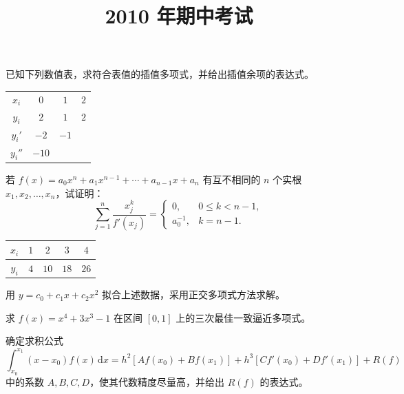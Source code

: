 \documentclass[fontset=exam]{exam-zh}
\title{2010 年期中考试}
\begin{document}
\maketitle
{}

\begin{question}[index=1]
已知下列数值表，求符合表值的插值多项式，并给出插值余项的表达式。
\begin{center}
\begin{tabular}{c|ccc}
$x_i$ & $0$ & $1$ & $2$ \\
$y_i$ & $2$ & $1$ & $2$ \\
$y_i'$ & $-2$ & $-1$ & \\
$y_i''$ & $-10$ & &
\end{tabular}
\end{center}
\end{question}

\begin{question}[index=2]
若 $f(x)=a_0x^n+a_1x^{n-1}+\cdots+a_{n-1}x+a_n$ 有互不相同的 $n$ 个实根
$x_1,x_2,\ldots,x_n$，试证明：
\[
\sum_{j=1}^{n}\frac{x_j^k}{f'(x_j)}=
\begin{cases}
0, & 0\leq k<n-1,\\
a_0^{-1}, & k=n-1.
\end{cases}
\]
\end{question}

\begin{question}[index=3]
\begin{tabular}{|c|c|c|c|c|}
\hline
$x_i$ & $1$ & $2$ & $3$ & $4$ \\ \hline
$y_i$ & $4$ & $10$ & $18$ & $26$ \\ \hline
\end{tabular}
\par
用 $y=c_0+c_1x+c_2x^2$ 拟合上述数据，采用正交多项式方法求解。
\end{question}

\begin{question}[index=4]
求 $f(x)=x^4+3x^3-1$ 在区间 $[0,1]$ 上的三次最佳一致逼近多项式。
\end{question}

\begin{question}[index=5]
确定求积公式
\[
\int_{x_0}^{x_1}(x-x_0)f(x)\,\mathrm{d}x
=h^2[Af(x_0)+Bf(x_1)]+h^3[Cf'(x_0)+Df'(x_1)]+R(f)
\]
中的系数 $A,B,C,D$，使其代数精度尽量高，并给出 $R(f)$ 的表达式。
\end{question}
\end{document}
